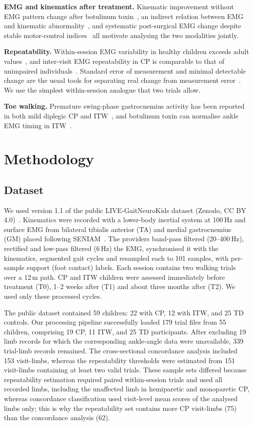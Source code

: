 \documentclass[conference]{IEEEtran}
\begin{document}
\textbf{EMG and kinematics after treatment.} Kinematic improvement without EMG pattern change after botulinum toxin~\cite{vanderhouwen2011btx}, an indirect relation between EMG and kinematic abnormality~\cite{syczewska2016emg}, and systematic post-surgical EMG change despite stable motor-control indices~\cite{davoudi2025fingerprint} all motivate analysing the two modalities jointly.

\textbf{Repeatability.} Within-session EMG variability in healthy children exceeds adult values~\cite{granata2005repeat}, and inter-visit EMG repeatability in CP is comparable to that of unimpaired individuals~\cite{steele2019repeat}. Standard error of measurement and minimal detectable change are the usual tools for separating real change from measurement error~\cite{weir2005icc}. We use the simplest within-session analogue that two trials allow.

\textbf{Toe walking.} Premature swing-phase gastrocnemius activity has been reported in both mild diplegic CP and ITW~\cite{policy2001itw}, and botulinum toxin can normalise ankle EMG timing in ITW~\cite{brunt2004itw}.

\section{Methodology}
\subsection{Dataset}
We used version 1.1 of the public LIVE-GaitNeuroKids dataset (Zenodo, CC BY 4.0)~\cite{fernandez2026live,zenodo2026live}. Kinematics were recorded with a lower-body inertial system at 100\,Hz and surface EMG from bilateral tibialis anterior (TA) and medial gastrocnemius (GM) placed following SENIAM~\cite{hermens2000seniam}. The providers band-pass filtered (20--400\,Hz), rectified and low-pass filtered (6\,Hz) the EMG, synchronised it with the kinematics, segmented gait cycles and resampled each to 101 samples, with per-sample support (foot contact) labels. Each session contains two walking trials over a 12\,m path. CP and ITW children were assessed immediately before treatment (T0), 1--2 weeks after (T1) and about three months after (T2). We used only these processed cycles.

The public dataset contained 59 children: 22 with CP, 12 with ITW, and 25 TD controls. Our processing pipeline successfully loaded 179 trial files from 55 children, comprising 19 CP, 11 ITW, and 25 TD participants. After excluding 19 limb records for which the corresponding ankle-angle data were unavailable, 339 trial-limb records remained. The cross-sectional concordance analysis included 153 visit-limbs, whereas the repeatability thresholds were estimated from 151 visit-limbs containing at least two valid trials. These sample sets differed because repeatability estimation required paired within-session trials and used all recorded limbs, including the unaffected limb in hemiparetic and monoparetic CP, whereas concordance classification used visit-level mean scores of the analysed limbs only; this is why the repeatability set contains more CP visit-limbs (75) than the concordance analysis (62).
\end{document}
